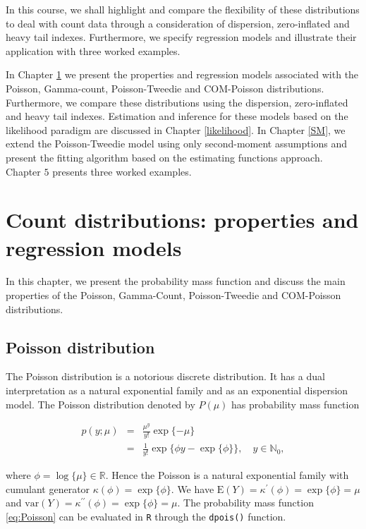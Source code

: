 \documentclass[9pt,a5paper,]{book}
\theoremstyle{definition}
\theoremstyle{definition}
\theoremstyle{remark}
\begin{document}
In this course, we shall highlight and compare the flexibility of these
distributions to deal with count data through a consideration of
dispersion, zero-inflated and heavy tail indexes. Furthermore, we
specify regression models and illustrate their application with three
worked examples.

In Chapter \ref{models} we present the properties and regression models
associated with the Poisson, Gamma-count, Poisson-Tweedie and
COM-Poisson distributions. Furthermore, we compare these distributions
using the dispersion, zero-inflated and heavy tail indexes. Estimation
and inference for these models based on the likelihood paradigm are
discussed in Chapter \ref{likelihood}. In Chapter \ref{SM}, we extend
the Poisson-Tweedie model using only second-moment assumptions and
present the fitting algorithm based on the estimating functions
approach. Chapter \(5\) presents three worked examples.

\chapter{Count distributions: properties and regression
models}\label{models}

In this chapter, we present the probability mass function and discuss
the main properties of the Poisson, Gamma-Count, Poisson-Tweedie and
COM-Poisson distributions.

\section{Poisson distribution}\label{poisson-distribution}

The Poisson distribution is a notorious discrete distribution. It has a
dual interpretation as a natural exponential family and as an
exponential dispersion model. The Poisson distribution denoted by
\(P(\mu)\) has probability mass function

\begin{eqnarray}
p(y;\mu) &=& \frac{\mu^y}{y!}\exp\{-\mu\} \nonumber \\
         &=& \frac{1}{y!} \exp \{\phi y -  \exp\{\phi\} \}, \quad y \in \mathbb{N}_{0},
\label{eq:Poisson}
\end{eqnarray}

where \(\phi = \log \{\mu\} \in \mathbb{R}\). Hence the Poisson is a
natural exponential family with cumulant generator
\(\kappa(\phi) = \exp\{\phi\}\). We have
\(\mathrm{E}(Y) = \kappa^{\prime}(\phi) = \exp\{\phi\} = \mu\) and
\(\mathrm{var}(Y) = \kappa^{\prime \prime}(\phi) = \exp\{\phi\} = \mu\).
The probability mass function \eqref{eq:Poisson} can be evaluated in
\texttt{R} through the \texttt{dpois()} function.
\end{document}
